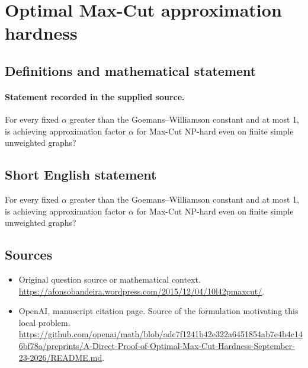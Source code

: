\documentclass[11pt]{article}
\begin{document}
\section*{Optimal Max-Cut approximation hardness}\label{30007463}
\subsection{Definitions and mathematical statement}
\paragraph{Statement recorded in the supplied source.}
For every fixed $\alpha $ greater than the Goemans–Williamson constant and at most 1, is achieving approximation factor $\alpha $ for Max-Cut NP-hard even on finite simple unweighted graphs?
\subsection{Short English statement}
For every fixed $\alpha $ greater than the Goemans–Williamson constant and at most 1, is achieving approximation factor $\alpha $ for Max-Cut NP-hard even on finite simple unweighted graphs?
\subsection{Sources}
\begin{itemize}
\item[S1] Original question source or mathematical context.
\url{https://afonsobandeira.wordpress.com/2015/12/04/10l42pmaxcut/}.
\item[S2] OpenAI, manuscript citation page. Source of the formulation motivating this local problem.
\url{https://github.com/openai/math/blob/adc7f1241b42e322a6451854ab7e4b4c146bf78a/preprints/A-Direct-Proof-of-Optimal-Max-Cut-Hardness-September-23-2026/README.md}.
\end{itemize}
\end{document}
